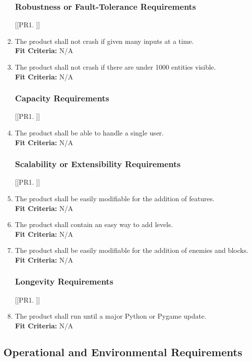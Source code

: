\documentclass[12pt, titlepage]{article}
\begin{document}
\begin{enumerate}[{PR}1. ]
\subsubsection{Robustness or Fault-Tolerance Requirements}
[{[{PR}1. ]}]
    \item The product shall not crash if given many inputs at a time.\\
    \textbf{Fit Criteria:} N/A
    \item The product shall not crash if there are under 1000 entities visible.\\
    \textbf{Fit Criteria:} N/A

\subsubsection{Capacity Requirements}
[{[{PR}1. ]}]
    \item The product shall be able to handle a single user.\\
    \textbf{Fit Criteria:} N/A

\subsubsection{Scalability or Extensibility Requirements}
[{[{PR}1. ]}]
    \item The product shall be easily modifiable for the addition of features.\\
    \textbf{Fit Criteria:} N/A
    \item The product shall contain an easy way to add levels.\\
    \textbf{Fit Criteria:} N/A
    \item The product shall be easily modifiable for the addition of enemies and blocks.\\
    \textbf{Fit Criteria:} N/A

\subsubsection{Longevity Requirements}
[{[{PR}1. ]}]
    \item The product shall run until a major Python or Pygame update.\\
    \textbf{Fit Criteria:} N/A
\end{enumerate}



\subsection{Operational and Environmental Requirements}
\end{document}
